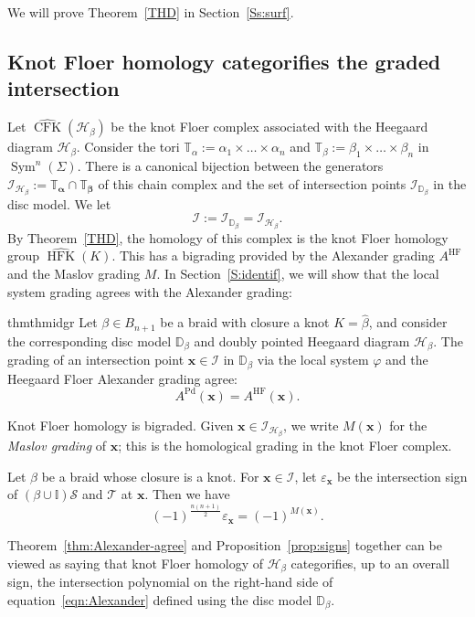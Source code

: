 \documentclass[11pt]{amsart}
\numberwithin{equation}{section}
\numberwithin{figure}{section}
\theoremstyle{definition}
\newcommand{\cH}{\mathcal{H}}
\newcommand{\cI}{\mathcal{I}}
\newcommand{\cs}{\mathscr{S}}
\newcommand{\ct}{\mathscr{T}}
\newcommand{\bD}{\mathbb{D}}
\newcommand{\bI}{\mathbb{I}}
\newcommand{\bT}{\mathbb{T}}
\DeclareMathOperator{\Sym}{Sym}
\DeclareMathOperator{\CFK}{CFK}
\newcommand{\CFKh}{\widehat{\CFK}}
\DeclareMathOperator{\HF}{HF}
\DeclareMathOperator{\HFK}{HFK}
\newcommand{\HFKh}{\widehat{\HFK}}
\DeclareMathOperator{\Pd}{Pd}
\newcommand{\as}{\boldsymbol{\alpha}}
\newcommand{\bs}{\boldsymbol{\beta}}
\newcommand{\xs}{\boldsymbol{x}}
\begin{document}
We will prove Theorem~\ref{THD} in Section~\ref{Ss:surf}.

\subsection{Knot Floer homology categorifies the graded intersection} 
Let $\CFKh(\mathscr H_{\beta})$ be the knot Floer complex associated with the Heegaard diagram $\mathscr H_{\beta}$. Consider the tori $\mathbb T_{\alpha} := \alpha_1 \times \dots \times \alpha_n$ and $\mathbb T_{\beta} := \beta_1 \times \dots \times \beta_n$ in $\Sym^n(\Sigma)$. There is a canonical bijection between the generators $\cI_{\cH_\beta} := \bT_{\as} \cap \bT_{\bs}$ of this chain complex and the set of intersection points $\cI_{\bD_\beta}$ in the disc model. We let 
\[
\cI := \cI_{\bD_\beta} = \cI_{\cH_\beta}. 
\]
By Theorem~\ref{THD}, the homology of this complex is the knot Floer homology group $\HFKh(K)$. This has a bigrading provided by the Alexander grading $A^{\HF}$ and the Maslov grading $M$. In Section~\ref{S:identif}, we will show that the local system grading agrees with the Alexander grading:

\begin{restatable}{thm}{thmidgr}
\label{thm:Alexander-agree} 
Let $\beta \in B_{n+1}$ be a braid with closure a knot $K = \hat{\beta}$, and consider the corresponding disc model $\bD_\beta$ and doubly pointed Heegaard diagram $\cH_{\beta}$. The grading of an intersection point $\xs \in \cI$ in $\bD_\beta$ via the local system $\varphi$ and the Heegaard Floer Alexander grading agree:
\begin{equation}
A^{\Pd}(\xs) = A^{\HF}(\xs).
\end{equation}
\end{restatable}

Knot Floer homology is bigraded. Given $\xs \in \cI_{\cH_\beta}$, we write $M(\xs)$ for the \emph{Maslov grading} of $\xs$; this is the homological grading in the knot Floer complex.

\begin{prop}\label{prop:signs} 
Let $\beta$ be a braid whose closure is a knot. For $\xs \in \cI$, let $\varepsilon_{\xs}$ be the intersection sign of $(\beta \cup \bI)\cs$ and $\ct$ at $\xs$. Then we have
\[
(-1)^{\frac{n(n+1)}{2}} \varepsilon_{\xs} = (-1)^{M(\xs)}.
\]
\end{prop}

\begin{rmk}\label{rmk:signs}
Theorem~\ref{thm:Alexander-agree} and Proposition~\ref{prop:signs} together can be viewed as saying that knot Floer homology of $\cH_\beta$ categorifies, up to an overall sign, the intersection polynomial on the right-hand side of equation~\eqref{eqn:Alexander} defined using the disc model $\bD_\beta$.
\end{rmk}
\end{document}
